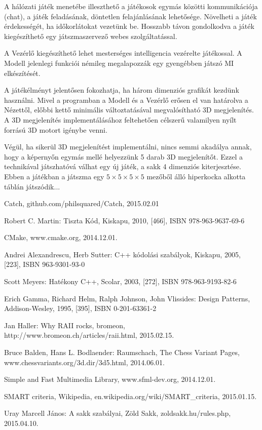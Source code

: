 \documentclass[12pt, twoside]{report}
\begin{document}
A hálózati játék menetébe illeszthető a játékosok egymás közötti kommunikációja (chat), a játék feladásának, döntetlen felajánlásának lehetősége. Növelheti a játék érdekességét, ha időkorlátokat vezetünk be. Hosszabb távon gondolkodva a játék kiegészíthető egy játszmaszervező webes szolgáltatással.

A Vezérlő kiegészíthető lehet mesterséges intelligencia vezérelte játékossal. A Modell jelenlegi funkciói némileg megalapozzák egy gyengébben játszó MI elkészítését.

A játékélményt jelentősen fokozhatja, ha három dimenziós grafikát kezdünk használni. Mivel a programban a Modell és a Vezérlő erősen el van határolva a Nézettől, előbbi kettő minimális változtatásával megvalósítható 3D megjelenítés. A 3D megjelenítés implementálásához feltehetően célszerű valamilyen nyílt forrású 3D motort igénybe venni.

Végül, ha sikerül 3D megjelenítést implementálni, nincs semmi akadálya annak, hogy a képernyőn egymás mellé helyezzünk 5 darab 3D megjelenítőt. Ezzel a technikával játszhatóvá válhat egy új játék, a sakk 4 dimenziós kiterjesztése. Ebben a játékban a játszma egy $5 \times 5 \times 5 \times 5$ mezőből álló hiperkocka alkotta táblán játszódik... 

\begin{thebibliography}{CMake}
	 Catch, github.com/philsquared/Catch, 2015.02.01
			
	 Robert C. Martin: Tiszta Kód, Kiskapu, 2010, [466], ISBN 978-963-9637-69-6

	 CMake, www.cmake.org, 2014.12.01.
	
	 Andrei Alexandrescu, Herb Sutter: C++ kódolási szabályok, Kiskapu, 2005, [223], ISBN 963-9301-93-0
	
	 Scott Meyers: Hatékony C++, Scolar, 2003, [272], ISBN 978-963-9193-82-6
	
	 Erich Gamma, Richard Helm, Ralph Johnson, John Vlissides: Design Patterns, Addison-Wesley, 1995, [395], ISBN 0-201-63361-2
	
	 Jan Haller: Why RAII rocks, bromeon, http://www.bromeon.ch/articles/raii.html, 2015.02.15.
	
	 Bruce Balden, Hans L. Bodlaender: Raumschach, The Chess Variant Pages, www.chessvariants.org/3d.dir/3d5.html, 2014.06.01.
		
	 Simple and Fast Multimedia Library, www.sfml-dev.org, 2014.12.01.
	
	 SMART criteria, Wikipedia, en.wikipedia.org/wiki/SMART\_criteria, 2015.01.15.
	
	 Uray Marcell János: A sakk szabályai, Zöld Sakk, zoldsakk.hu/rules.php, 2015.04.10.
\end{thebibliography}
\end{document}
